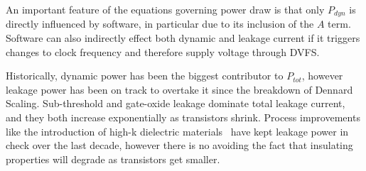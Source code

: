 An important feature of the equations governing power draw is that only $P_{dyn}$ is directly influenced by software, in particular due to its inclusion of the $A$ term. Software can also indirectly effect both dynamic and leakage current if it triggers changes to clock frequency and therefore supply voltage through DVFS.  

Historically, dynamic power has been the biggest contributor to $P_{tot}$, however leakage power has been on track to overtake it since the breakdown of Dennard Scaling.  Sub-threshold and gate-oxide leakage dominate total leakage current, and they both increase exponentially as transistors shrink. Process improvements like the introduction of high-k dielectric materials~\cite{jan:2009aa} have kept leakage power in check over the last decade, however there is no avoiding the fact that insulating properties will degrade as transistors get smaller.
